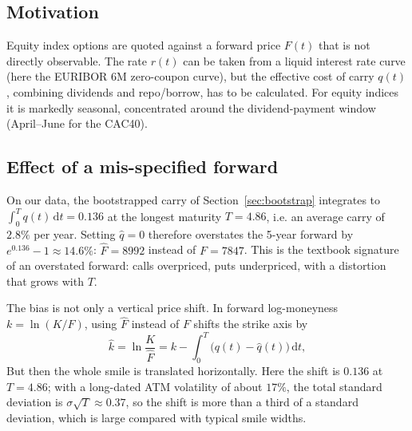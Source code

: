 \documentclass[11pt,a4paper]{article}
\theoremstyle{plain}
\theoremstyle{definition}
\newcommand{\dd}{\mathrm{d}}
\begin{document}
\subsection{Motivation}
Equity index options are quoted against a forward price $F(t)$ that is not directly observable. The rate $r(t)$ can be taken from a liquid interest rate curve (here the EURIBOR 6M zero-coupon curve), but the effective cost of carry $q(t)$, combining dividends and repo/borrow, has to be calculated. For equity indices it is markedly seasonal, concentrated around the dividend-payment window (April--June for the CAC40).

\subsection{Effect of a mis-specified forward}

On our data, the bootstrapped carry of Section~\ref{sec:bootstrap} integrates to $\int_0^Tq(t)\,\dd t=0.136$ at the longest maturity $T=4.86$, i.e. an average carry of $2.8\%$ per year. Setting $\hat q=0$ therefore overstates the 5-year forward by $e^{0.136}-1\approx14.6\%$: $\hat F=8992$ instead of $F=7847$. This is the textbook signature of an overstated forward: calls overpriced, puts underpriced, with a distortion that grows with $T$.

The bias is not only a vertical price shift. In forward log-moneyness $k=\ln(K/F)$, using $\hat F$ instead of $F$ shifts the strike axis by
\begin{equation}
    \hat k=\ln\frac{K}{\hat F}=k-\int_0^T\bigl(q(t)-\hat q(t)\bigr)\,\dd t,
\end{equation}
But then the whole smile is translated horizontally. Here the shift is $0.136$ at $T=4.86$; with a long-dated ATM volatility of about $17\%$, the total standard deviation is $\sigma\sqrt T\approx0.37$, so the shift is more than a third of a standard deviation, which is large compared with typical smile widths.
\end{document}
